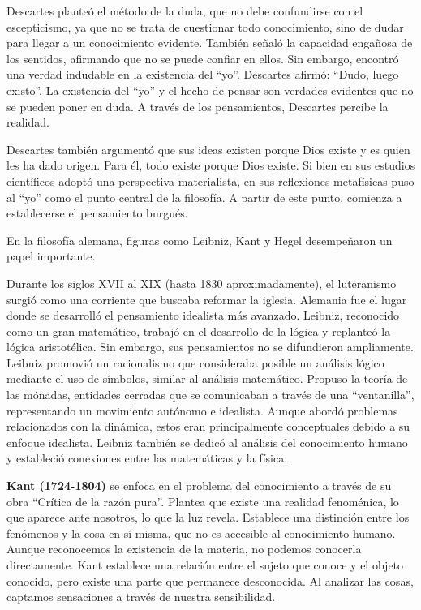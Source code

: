\documentclass[
  a4paper,
]{article}
\begin{document}
Descartes planteó el método de la duda, que no debe confundirse con el
escepticismo, ya que no se trata de cuestionar todo conocimiento, sino
de dudar para llegar a un conocimiento evidente. También señaló la
capacidad engañosa de los sentidos, afirmando que no se puede confiar en
ellos. Sin embargo, encontró una verdad indudable en la existencia del
``yo''. Descartes afirmó: ``Dudo, luego existo''. La existencia del
``yo'' y el hecho de pensar son verdades evidentes que no se pueden
poner en duda. A través de los pensamientos, Descartes percibe la
realidad.

Descartes también argumentó que sus ideas existen porque Dios existe y
es quien les ha dado origen. Para él, todo existe porque Dios existe. Si
bien en sus estudios científicos adoptó una perspectiva materialista, en
sus reflexiones metafísicas puso al ``yo'' como el punto central de la
filosofía. A partir de este punto, comienza a establecerse el
pensamiento burgués.

En la filosofía alemana, figuras como Leibniz, Kant y Hegel desempeñaron
un papel importante.

Durante los siglos XVII al XIX (hasta 1830 aproximadamente), el
luteranismo surgió como una corriente que buscaba reformar la iglesia.
Alemania fue el lugar donde se desarrolló el pensamiento idealista más
avanzado. Leibniz, reconocido como un gran matemático, trabajó en el
desarrollo de la lógica y replanteó la lógica aristotélica. Sin embargo,
sus pensamientos no se difundieron ampliamente. Leibniz promovió un
racionalismo que consideraba posible un análisis lógico mediante el uso
de símbolos, similar al análisis matemático. Propuso la teoría de las
mónadas, entidades cerradas que se comunicaban a través de una
``ventanilla'', representando un movimiento autónomo e idealista. Aunque
abordó problemas relacionados con la dinámica, estos eran principalmente
conceptuales debido a su enfoque idealista. Leibniz también se dedicó al
análisis del conocimiento humano y estableció conexiones entre las
matemáticas y la física.

\textbf{Kant (1724-1804)} se enfoca en el problema del conocimiento a
través de su obra ``Crítica de la razón pura''. Plantea que existe una
realidad fenoménica, lo que aparece ante nosotros, lo que la luz revela.
Establece una distinción entre los fenómenos y la cosa en sí misma, que
no es accesible al conocimiento humano. Aunque reconocemos la existencia
de la materia, no podemos conocerla directamente. Kant establece una
relación entre el sujeto que conoce y el objeto conocido, pero existe
una parte que permanece desconocida. Al analizar las cosas, captamos
sensaciones a través de nuestra sensibilidad.
\end{document}
